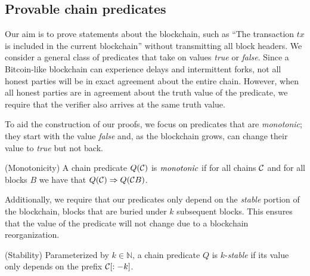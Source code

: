 \subsection{Provable chain predicates}

Our aim is to prove statements about the blockchain, such as ``The transaction
$tx$ is included in the current blockchain'' without transmitting all block
headers. We consider a general class of predicates that take on values
\emph{true} or \emph{false}.  Since a Bitcoin-like blockchain can experience
delays and intermittent forks, not all honest parties will be in exact agreement
about the entire chain. However, when all honest parties are in agreement about
the truth value of the predicate, we require that the verifier also arrives at
the same truth value.

To aid the construction of our proofs, we focus on predicates that are
\emph{monotonic}; they start with the value \emph{false} and, as the blockchain
grows, can change their value to \emph{true} but not back.

\begin{definition}{(Monotonicity)}
    A chain predicate $Q(\mathcal{C})$ is $\emph{monotonic}$ if for all chains
    $\mathcal{C}$ and for all blocks $B$ we have that
    $Q(\mathcal{C}) \Rightarrow Q(\mathcal{C} B)$.
\end{definition}

Additionally, we require that our predicates only depend on the \emph{stable}
portion of the blockchain, blocks that are buried under $k$ subsequent blocks.
This ensures that the value of the predicate will not change due to a blockchain
reorganization.

\begin{definition}{(Stability)}
    Parameterized by $k \in \mathbb{N}$, a chain predicate $Q$ is
    $k$-\emph{stable} if its value only depends on the prefix $\mathcal{C}[:-k]$.
\end{definition}
